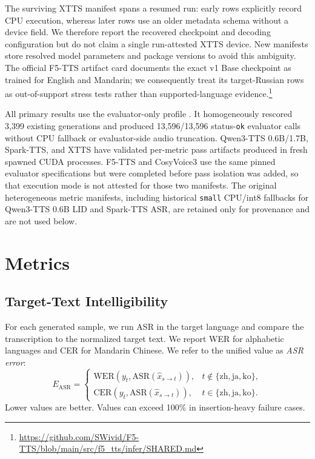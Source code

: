 \documentclass[11pt]{article}
\begin{document}
The surviving XTTS manifest spans a resumed run: early rows explicitly record CPU execution, whereas later rows use an older metadata schema without a device field. We therefore report the recovered checkpoint and decoding configuration but do not claim a single run-attested XTTS device. New manifests store resolved model parameters and package versions to avoid this ambiguity. The official F5-TTS artifact card documents the exact v1 Base checkpoint as trained for English and Mandarin; we consequently treat its target-Russian rows as out-of-support stress tests rather than supported-language evidence.\footnote{\url{https://github.com/SWivid/F5-TTS/blob/main/src/f5_tts/infer/SHARED.md}}

All primary results use the evaluator-only profile . It homogeneously rescored 3,399 existing generations and produced 13,596/13,596 status-\texttt{ok} evaluator calls without CPU fallback or evaluator-side audio truncation. Qwen3-TTS 0.6B/1.7B, Spark-TTS, and XTTS have validated per-metric pass artifacts produced in fresh spawned CUDA processes. F5-TTS and CosyVoice3 use the same pinned evaluator specifications but were completed before pass isolation was added, so that execution mode is not attested for those two manifests. The original heterogeneous metric manifests, including historical \texttt{small} CPU/int8 fallbacks for Qwen3-TTS 0.6B LID and Spark-TTS ASR, are retained only for provenance and are not used below.

\section{Metrics}

\subsection{Target-Text Intelligibility}

For each generated sample, we run ASR in the target language and compare the transcription to the normalized target text. We report WER for alphabetic languages and CER for Mandarin Chinese. We refer to the unified value as \textit{ASR error}:
\begin{equation}
    E_{\mathrm{ASR}} =
    \begin{cases}
        \mathrm{WER}(y_t, \mathrm{ASR}(\hat{x}_{s\rightarrow t})), & t \notin \{\mathrm{zh}, \mathrm{ja}, \mathrm{ko}\},\\
        \mathrm{CER}(y_t, \mathrm{ASR}(\hat{x}_{s\rightarrow t})), & t \in \{\mathrm{zh}, \mathrm{ja}, \mathrm{ko}\}.
    \end{cases}
\end{equation}
Lower values are better. Values can exceed 100\% in insertion-heavy failure cases.
\end{document}
